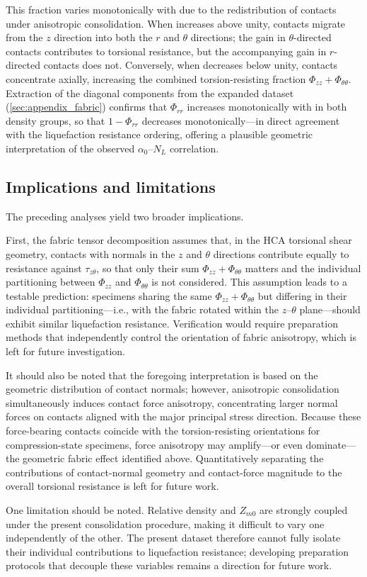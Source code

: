 This fraction varies monotonically with \Kzero{} due to the redistribution of contacts under anisotropic consolidation. When \Kzero{} increases above unity, contacts migrate from the $z$ direction into both the $r$ and $\theta$ directions; the gain in $\theta$-directed contacts contributes to torsional resistance, but the accompanying gain in $r$-directed contacts does not. Conversely, when \Kzero{} decreases below unity, contacts concentrate axially, increasing the combined torsion-resisting fraction $\Phi_{zz} + \Phi_{\theta\theta}$. Extraction of the diagonal components from the expanded dataset (\cref{sec:appendix_fabric}) confirms that $\Phi_{rr}$ increases monotonically with \Kzero{} in both density groups, so that $1 - \Phi_{rr}$ decreases monotonically---in direct agreement with the liquefaction resistance ordering, offering a plausible geometric interpretation of the observed $\alpha_0$--$N_L$ correlation.

\subsection{Implications and limitations}
\label{subsec:limitations}

The preceding analyses yield two broader implications.

First, the fabric tensor decomposition assumes that, in the HCA torsional shear geometry, contacts with normals in the $z$ and $\theta$ directions contribute equally to resistance against $\tau_{z\theta}$, so that only their sum $\Phi_{zz} + \Phi_{\theta\theta}$ matters and the individual partitioning between $\Phi_{zz}$ and $\Phi_{\theta\theta}$ is not considered. This assumption leads to a testable prediction: specimens sharing the same $\Phi_{zz} + \Phi_{\theta\theta}$ but differing in their individual partitioning---i.e., with the fabric rotated within the $z$--$\theta$ plane---should exhibit similar liquefaction resistance. Verification would require preparation methods that independently control the orientation of fabric anisotropy, which is left for future investigation.

It should also be noted that the foregoing interpretation is based on the geometric distribution of contact normals; however, anisotropic consolidation simultaneously induces contact force anisotropy, concentrating larger normal forces on contacts aligned with the major principal stress direction. Because these force-bearing contacts coincide with the torsion-resisting orientations for compression-state specimens, force anisotropy may amplify---or even dominate---the geometric fabric effect identified above. Quantitatively separating the contributions of contact-normal geometry and contact-force magnitude to the overall torsional resistance is left for future work.

One limitation should be noted. Relative density and $Z_{m0}$ are strongly coupled under the present consolidation procedure, making it difficult to vary one independently of the other. The present dataset therefore cannot fully isolate their individual contributions to liquefaction resistance; developing preparation protocols that decouple these variables remains a direction for future work.
